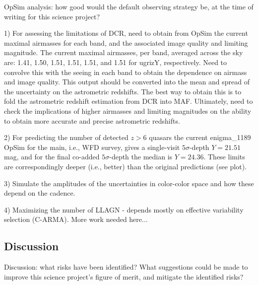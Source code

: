 OpSim analysis: how good would the default observing strategy be, at
the time of writing for this science project?

1) For assessing the limitations of DCR, need to obtain from OpSim
the current maximal airmasses for each band, and the associated
image quality and limiting magnitude. The current maximal airmasses,
per band, averaged across the sky are: 1.41, 1.50, 1.51, 1.51, 1.51,
and 1.51 for ugrizY, respectively. Need to convolve this with the
seeing in each band to obtain the dependence on airmass and image
quality. This output should be converted into the mean and spread
of the uncertainty on the astrometric redshifts. The best way
to obtain this is to fold the astrometric redshift estimation from
DCR into MAF. Ultimately, need to check the implications of higher
airmasses and limiting magnitudes on the ability to obtain more accurate
and precise astrometric redshifts.

2) For predicting the number of detected $z>6$ quasars
the current enigma\_1189 OpSim for the main, i.e., WFD survey, gives a single-visit
$5\sigma$-depth
$Y=21.51$ mag, and for the final co-added $5\sigma$-depth the median is $Y=24.36$.
These limits are correspondingly deeper (i.e., better) than the original predictions
(see plot).


3) Simulate the amplitudes of the uncertainties in color-color space and how
these depend on the cadence.

4) Maximizing the number of LLAGN - depends mostly on effective variability selection
(C-ARMA). More work needed here...


\subsection{Discussion}
\label{sec:\secname:discussion}

Discussion: what risks have been identified? What suggestions could be
made to improve this science project's figure of merit, and mitigate
the identified risks?



\navigationbar

